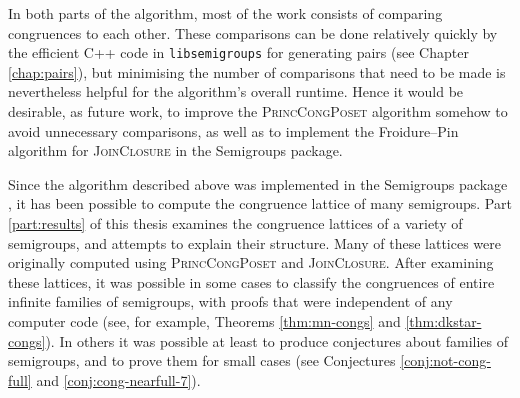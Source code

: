 In both parts of the algorithm, most of the work consists of comparing
congruences to each other.  These comparisons can be done relatively quickly by
the efficient C++ code in \texttt{libsemigroups} for generating pairs (see
Chapter \ref{chap:pairs}), but minimising the number of comparisons that need to
be made is nevertheless helpful for the algorithm's overall runtime.  Hence it
would be desirable, as future work, to improve the \textsc{PrincCongPoset}
algorithm somehow to avoid unnecessary comparisons, as well as to implement the
Froidure--Pin algorithm for \textsc{JoinClosure} in the Semigroups package.

Since the algorithm described above was implemented in the Semigroups package
\cite{semigroups}, it has been possible to compute the congruence lattice of
many semigroups.  Part \ref{part:results} of this thesis examines
the congruence lattices of a variety of semigroups, and attempts to explain
their structure.  Many of these lattices were originally computed using
\textsc{PrincCongPoset} and \textsc{JoinClosure}.  After examining these
lattices, it was possible in some cases to classify the congruences of entire
infinite families of semigroups, with proofs that were independent of any
computer code (see, for example, Theorems \ref{thm:mn-congs} and
\ref{thm:dkstar-congs}).  In others it was possible at least to produce
conjectures about families of semigroups, and to prove them for small cases (see
Conjectures \ref{conj:not-cong-full} and \ref{conj:cong-nearfull-7}).
